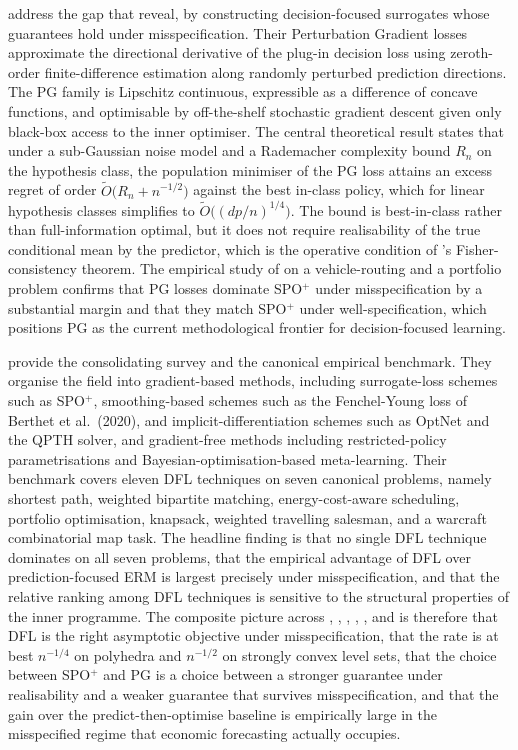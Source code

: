 \citet{HuangGupta2024} address the gap that \citet{HuKallus2020} reveal, by
constructing decision-focused surrogates whose guarantees hold under
misspecification. Their Perturbation Gradient losses approximate the directional
derivative of the plug-in decision loss using zeroth-order finite-difference
estimation along randomly perturbed prediction directions. The PG family is
Lipschitz continuous, expressible as a difference of concave functions, and
optimisable by off-the-shelf stochastic gradient descent given only black-box
access to the inner optimiser. The central theoretical result states that under a
sub-Gaussian noise model and a Rademacher complexity bound $R_n$ on the
hypothesis class, the population minimiser of the PG loss attains an excess
regret of order $\widetilde O\bigl( R_n + n^{-1/2} \bigr)$ against the best
in-class policy, which for linear hypothesis classes simplifies to
$\widetilde O\bigl( (dp/n)^{1/4} \bigr)$. The bound is best-in-class rather than
full-information optimal, but it does not require realisability of the true
conditional mean by the predictor, which is the operative condition of
\citet{ElmachtoubGrigas2022}'s Fisher-consistency theorem. The empirical study
of \citet{HuangGupta2024} on a vehicle-routing and a portfolio problem confirms
that PG losses dominate SPO$^+$ under misspecification by a substantial
margin and that they match SPO$^+$ under well-specification, which positions PG
as the current methodological frontier for decision-focused learning.

\citet{Mandi2024} provide the consolidating survey and the canonical empirical
benchmark. They organise the field into gradient-based methods, including
surrogate-loss schemes such as SPO$^+$, smoothing-based schemes such as the
Fenchel-Young loss of Berthet et al.\ (2020), and implicit-differentiation schemes
such as OptNet and the QPTH solver, and gradient-free methods including
restricted-policy parametrisations and Bayesian-optimisation-based meta-learning.
Their benchmark covers eleven DFL techniques on seven canonical problems, namely
shortest path, weighted bipartite matching, energy-cost-aware scheduling,
portfolio optimisation, knapsack, weighted travelling salesman, and a warcraft
combinatorial map task. The headline finding is that no single DFL technique
dominates on all seven problems, that the empirical advantage of DFL over
prediction-focused ERM is largest precisely under misspecification, and that the
relative ranking among DFL techniques is sensitive to the structural properties
of the inner programme. The composite picture across
\citet{ElmachtoubGrigas2022}, \citet{LiuGrigas2021},
\citet{DontiAmosKolter2017}, \citet{HuKallus2020}, \citet{HuangGupta2024}, and
\citet{Mandi2024} is therefore that DFL is the right asymptotic objective under
misspecification, that the rate is at best $n^{-1/4}$ on polyhedra and $n^{-1/2}$
on strongly convex level sets, that the choice between SPO$^+$ and PG is a
choice between a stronger guarantee under realisability and a weaker guarantee
that survives misspecification, and that the gain over the predict-then-optimise
baseline is empirically large in the misspecified regime that economic
forecasting actually occupies.
